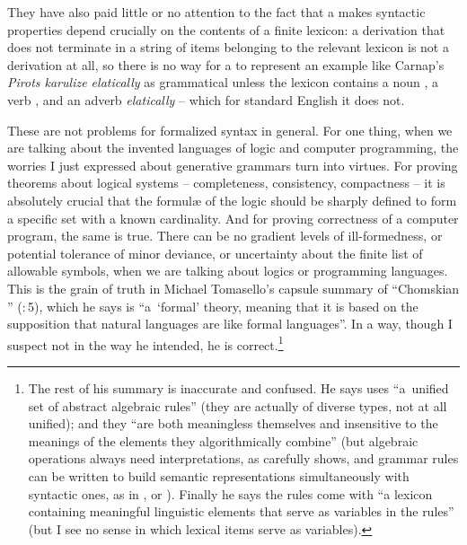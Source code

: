\documentclass[output=paper]{langscibook}
\begin{document}
They have also paid little or no attention to the fact that a  makes syntactic properties depend crucially on the contents of a finite lexicon: a derivation that does not terminate in a string of items belonging to the relevant lexicon is not a derivation at all, so there is no way for a  to represent an example like Carnap's \textit{Pirots karulize elatically} as grammatical unless the lexicon contains a noun , a verb , and an adverb \textit{elatically} -- which for standard English it does not.

These are not problems for formalized syntax in general. For one thing, when we are talking about the invented languages of logic and computer programming, the worries I just expressed about generative grammars turn into virtues. For proving theorems about logical systems -- completeness, consistency, compactness -- it is absolutely crucial that the formul{\ae} of the logic should be sharply defined to form a specific set with a known cardinality. And for proving correctness of a computer program, the same is true. There can be no gradient levels of ill-formedness, or potential tolerance of minor deviance, or uncertainty about the finite list of allowable symbols, when we are talking about logics or programming languages.  This is the grain of truth in Michael Tomasello's capsule summary of ``Chomskian '' (\citeyear{Tomasello03}:\,5), which he says is ``a~`formal' theory, meaning that it is based on the supposition that natural languages are like formal languages''. In a way, though I suspect not in the way he intended, he is correct.\footnote{The rest of his summary is inaccurate and confused. He says  uses ``a~unified set of abstract algebraic rules'' (they are actually of diverse types, not at all unified); and they ``are both meaningless themselves and insensitive to the meanings of the elements they algorithmically combine'' (but algebraic operations always need interpretations, as \citealt{McCawley68BASE} carefully shows, and grammar rules can be written to build semantic representations simultaneously with syntactic ones, as in \citealt{Montague73PTQ},      \citealt{Montague74} or \citealt{GaKlPuSa85}). Finally he says the rules come with ``a lexicon containing meaningful linguistic elements that      serve as variables in the rules'' (but I see no sense in which lexical items serve as variables).}
\end{document}
